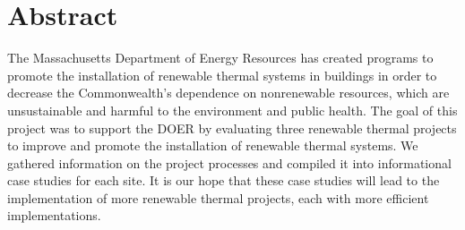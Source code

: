 \chapter*{Abstract}
%

\par The Massachusetts Department of Energy Resources has created programs to promote the installation of renewable thermal systems in buildings in order to decrease the Commonwealth’s dependence on nonrenewable resources, which are unsustainable and harmful to the environment and public health. The goal of this project was to support the DOER by evaluating three renewable thermal projects to improve and promote the installation of renewable thermal systems. We gathered information on the project processes and compiled it into informational case studies for each site. It is our hope that these case studies will lead to the implementation of more renewable thermal projects, each with more efficient implementations.